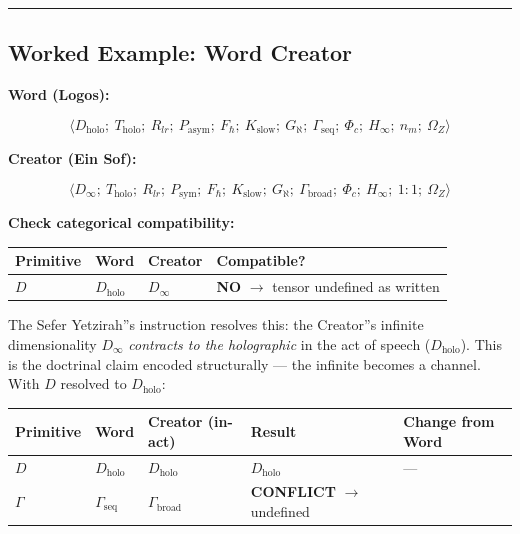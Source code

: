 \documentclass[11pt,a4paper]{article}
\begin{document}
\begin{center}
\rule{0.5\textwidth}{0.4pt}
\end{center}

\subsection{Worked Example: Word \otimes Creator}

\textbf{Word (Logos):}


\[\langle D_\text{holo};\ T_\text{holo};\ R_{lr};\ P_\text{asym};\ F_{\hbar};\ K_\text{slow};\ G_{\aleph};\ \Gamma_\text{seq};\ \Phi_c;\ H_{\infty};\ n_m;\ \Omega_Z \rangle\]

\textbf{Creator (Ein Sof):}


\[\langle D_{\infty};\ T_\text{holo};\ R_{lr};\ P_\text{sym};\ F_{\hbar};\ K_\text{slow};\ G_{\aleph};\ \Gamma_\text{broad};\ \Phi_c;\ H_{\infty};\ 1:1;\ \Omega_Z \rangle\]

\textbf{Check categorical compatibility:}

\begin{table}[htbp]
\centering
\small
{}
\begin{tabularx}{\textwidth}{>{\centering\arraybackslash}X >{\centering\arraybackslash}X >{\centering\arraybackslash}X >{\centering\arraybackslash}X}
\toprule
\rowcolor{gray!25}\textbf{Primitive} & \textbf{Word} & \textbf{Creator} & \textbf{Compatible?} \\
\midrule
\rowcolors{1}{white}{gray!10}
$D$ & $D_\text{holo}$ & $D_{\infty}$ & \textbf{NO} $\rightarrow$ tensor undefined as written \\
\bottomrule
\end{tabularx}
\end{table}

The Sefer Yetzirah''s instruction resolves this: the Creator''s infinite dimensionality $D_{\infty}$ \emph{contracts to the holographic} in the act of speech ($D_\text{holo}$). This is the doctrinal claim encoded structurally --- the infinite becomes a channel. With $D$ resolved to $D_\text{holo}$:

\begin{table}[htbp]
\centering
\small
{}
\begin{tabularx}{\textwidth}{>{\centering\arraybackslash}X >{\centering\arraybackslash}X >{\centering\arraybackslash}X >{\centering\arraybackslash}X >{\centering\arraybackslash}X}
\toprule
\rowcolor{gray!25}\textbf{Primitive} & \textbf{Word} & \textbf{Creator (in-act)} & \textbf{Result} & \textbf{Change from Word} \\
\midrule
\rowcolors{1}{white}{gray!10}
$D$ & $D_\text{holo}$ & $D_\text{holo}$ & $D_\text{holo}$ & --- \\
$\Gamma$ & $\Gamma_\text{seq}$ & $\Gamma_\text{broad}$ & \textbf{CONFLICT} $\rightarrow$ undefined &  \\
\bottomrule
\end{tabularx}
\end{table}
\end{document}

